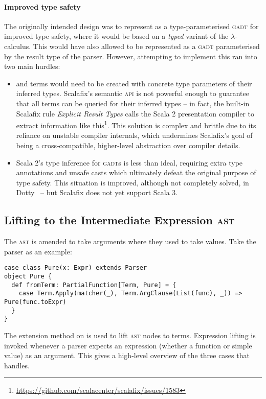 \documentclass[../../../main.tex]{subfiles}
\begin{document}
\paragraph{Improved type safety}
The originally intended design was to represent  as a type-parameterised \textsc{gadt} for improved type safety, where it would be based on a \emph{typed} variant of the $\lambda$-calculus.
This would have also allowed  to be represented as a \textsc{gadt} parameterised by the result type of the parser.
However, attempting to implement this ran into two main hurdles:
\begin{itemize}
  \item {} and  terms would need to be created with concrete type parameters of their inferred types. Scalafix's semantic \textsc{api} is not powerful enough to guarantee that all terms can be queried for their inferred types -- in fact, the built-in Scalafix rule \emph{Explicit Result Types} calls the Scala 2 presentation compiler to extract information like this\footnote{\url{https://github.com/scalacenter/scalafix/issues/1583}}. This solution is complex and brittle due to its reliance on unstable compiler internals, which undermines Scalafix's goal of being a cross-compatible, higher-level abstraction over compiler details.
  \item Scala 2's type inference for \textsc{gadt}s is less than ideal, requiring extra type annotations and unsafe casts which ultimately defeat the original purpose of type safety. This situation is improved, although not completely solved, in Dotty~\cite{parreaux_towards_2019} -- but Scalafix does not yet support Scala 3.
\end{itemize}

\subsection{Lifting to the Intermediate Expression \textsc{ast}}\label{sec:lifting-expr}
The  \textsc{ast} is amended to take  arguments where they used to take  values.
Take the  parser as an example:
\begin{verbatim}
case class Pure(x: Expr) extends Parser
object Pure {
  def fromTerm: PartialFunction[Term, Pure] = {
    case Term.Apply(matcher(_), Term.ArgClause(List(func), _)) => Pure(func.toExpr)
  }
}
\end{verbatim}
%
The  extension method on  is used to lift  \textsc{ast} nodes to  terms.
Expression lifting is invoked whenever a parser expects an expression (whether a function or simple value) as an argument.
This  gives a high-level overview of the three cases that  handles.
\end{document}
